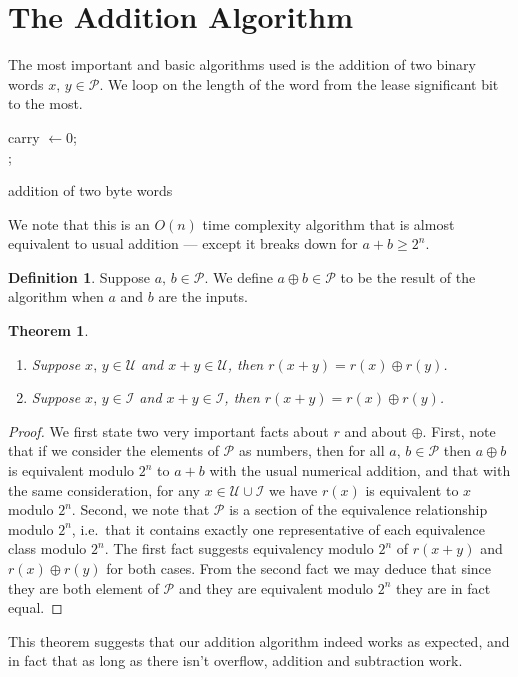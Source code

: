 \documentclass{amsart}
\theoremstyle{plain}
\newtheorem{theorem}{Theorem}[section]
\theoremstyle{definition}
\newtheorem{definition}{Definition}[section]
\theoremstyle{definition}
\theoremstyle{remark}
\begin{document}
\section{The Addition Algorithm}
The most important and basic algorithms used is the addition of two binary words \(x,\,y \in \mathcal{P}\). We loop on the length of the word from the lease significant bit to the most.
\begin{algorithm}
    carry \(\leftarrow 0\); \\
;
\caption{addition of two byte words}
\end{algorithm}
We note that this is an \(O \left(n\right)\) time complexity algorithm that is almost equivalent to usual addition --- except it breaks down for \(a + b \geq 2^{n}\).
\begin{definition}
    Suppose \(a,\,b \in \mathcal{P}\). We define \(a \oplus b \in \mathcal{P}\) to be the result of the algorithm when \(a\) and \(b\) are the inputs.
\end{definition}
\begin{theorem}
    \begin{enumerate}
        \item Suppose \(x,\,y \in \mathcal{U}\) and \(x + y \in \mathcal{U}\), then \(r \left(x + y\right) = r \left(x\right) \oplus r \left(y\right)\).
        \item Suppose \(x,\,y \in \mathcal{I}\) and \(x + y \in \mathcal{I}\), then \(r \left(x + y\right) = r \left(x\right) \oplus r \left(y\right)\).
    \end{enumerate}
\end{theorem}
\begin{proof}
    We first state two very important facts about \(r\) and about \(\oplus\). First, note that if we consider the elements of \(\mathcal{P}\) as numbers, then for all \(a,\,b \in \mathcal{P}\) then \(a \oplus b\) is equivalent modulo \(2^{n}\) to \(a + b\) with the usual numerical addition, and that with the same consideration, for any \(x \in \mathcal{U}\cup \mathcal{I}\) we have \(r \left(x\right)\) is equivalent to \(x\) modulo \(2^{n}\). Second, we note that
    \(\mathcal{P}\) is a section of the equivalence relationship modulo \(2^{n}\), i.e.\ that it contains exactly one representative of each equivalence class modulo \(2^{n}\). The first fact suggests equivalency modulo \(2^{n}\) of \(r \left(x + y\right)\) and \(r \left(x\right) \oplus r\left(y\right)\) for both cases. From the second fact we may deduce that since they are both element of \(\mathcal{P}\) and they are equivalent modulo \(2^{n}\) they are in fact equal.
\end{proof}
This theorem suggests that our addition algorithm indeed works as expected, and in fact that as long as there isn't overflow, addition and subtraction work.
\end{document}
